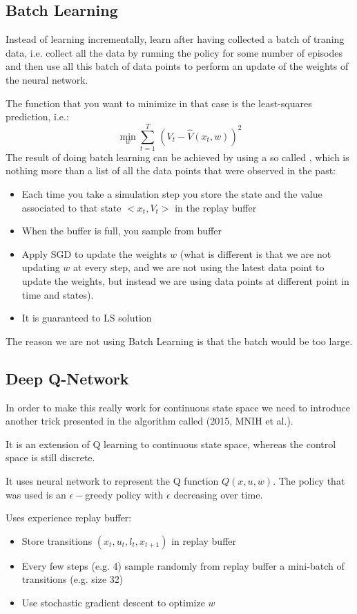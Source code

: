 \subsection{Batch Learning}
Instead of learning incrementally, learn after having collected a batch of traning data, i.e. collect all the data by running the policy for some number of episodes and then use all this batch of data points to perform an update of the weights of the neural network.

The function that you want to minimize in that case is the least-squares prediction, i.e.:
\[\min_w \sum_{t=1}^T \,(V_t - \hat{V}(x_t, w))^2\]
The result of doing batch learning can be achieved by using a so called , which is nothing more than a list of all the data points that were observed in the past:
\begin{itemize}
\item Each time you take a simulation step you store the state and the value associated to that state $<x_t, V_t>$ in the replay buffer
\item When the buffer is full, you sample from buffer
\item Apply SGD to update the weights $w$ (what is different is that we are not updating $w$ at every step, and we are not using the latest data point to update the weights, but instead we are using data points at different point in time and states).
\item It is guaranteed to LS solution
\end{itemize}
The reason we are not using Batch Learning is that the batch would be too large.

\subsection{Deep Q-Network}
In order to make this really work for continuous state space we need to introduce another trick presented in the algorithm called  (2015, MNIH et al.).

It is an extension of Q learning to continuous state space, whereas the control space is still discrete.

It uses neural network to represent the Q function $Q(x,u,w)$. The policy that was used is an $\epsilon-$greedy policy with $\epsilon$ decreasing over time.

Uses experience replay buffer:
\begin{itemize}
\item Store transitions $(x_t, u_t, l_t, x_{t+1})$ in replay buffer
\item Every few steps (e.g. 4) sample randomly from replay buffer a mini-batch of transitions (e.g. size 32)
\item Use stochastic gradient descent to optimize $w$
\end{itemize}

